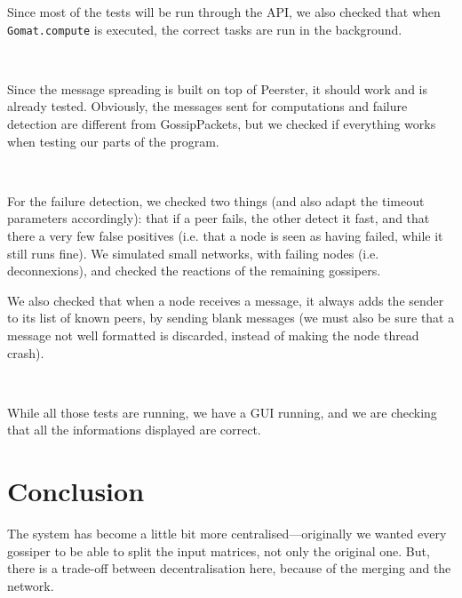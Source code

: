 \documentclass[a4paper,12pt]{article}
\begin{document}
    Since most of the tests will be run through the API, we also checked that when \texttt{Gomat.compute} is executed, the correct tasks are run in the background.

~~

    Since the message spreading is built on top of Peerster, it should work and is already tested. Obviously, the messages sent for computations and failure detection are different from GossipPackets, but we checked if everything works when testing our parts of the program.

~~

    For the failure detection, we checked two things (and also adapt the timeout parameters accordingly): that if a peer fails, the other detect it fast, and that there a very few false positives (i.e. that a node is seen as having failed, while it still runs fine). We simulated small networks, with failing nodes (i.e. deconnexions), and checked the reactions of the remaining gossipers.

    We also checked that when a node receives a message, it always adds the sender to its list of known peers, by sending blank messages (we must also be sure that a message not well formatted is discarded, instead of making the node thread crash).

~~

    While all those tests are running, we have a GUI running, and we are checking that all the informations displayed are correct.

    \section{Conclusion}
    The system has become a little bit more centralised---originally we wanted every gossiper to be able to split the input matrices, not only the original one. But, there is a trade-off between decentralisation here, because of the merging and the network.
\end{document}
